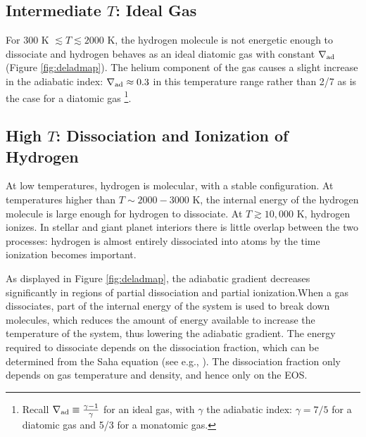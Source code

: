 \documentclass[apj]{emulateapj}
\newcommand{\delad}{\nabla_{\rm ad}}
\newcommand{\App}[1]{Appendix~\ref{#1}}
\begin{document}





\subsection{Intermediate $T$: Ideal Gas}

For $300$ K $\lesssim T \lesssim 2000$ K, the hydrogen molecule is not energetic enough to dissociate and hydrogen behaves as an ideal diatomic gas with constant $\delad$ (Figure \ref{fig:deladmap}). The helium component of the gas causes a slight increase in the adiabatic index: $\delad \approx 0.3$ in this temperature range rather than 2/7 as is the case for a diatomic gas \footnote{Recall $\delad \equiv \frac{\gamma-1}{\gamma}$ for an ideal gas, with $\gamma$ the adiabatic index: $\gamma=7/5$ for a diatomic gas and 5/3 for a monatomic gas.}.



\subsection{High $T$: Dissociation and Ionization of Hydrogen}

At low temperatures, hydrogen is molecular, with a stable configuration. At temperatures higher than $T \sim 2000-3000$ K, the internal energy of the hydrogen molecule is large enough for hydrogen to dissociate. At $T \gtrsim 10,000$ K, hydrogen ionizes. In stellar and giant planet interiors there is little overlap between the two processes: hydrogen is almost entirely dissociated into atoms by the time ionization becomes important. 

As displayed in Figure \ref{fig:deladmap}, the adiabatic gradient decreases significantly in regions of partial dissociation and partial ionization.When a gas dissociates, part of the internal energy of the system is used to break down molecules, which reduces the amount of energy available to increase the temperature of the system, thus lowering the adiabatic gradient. The energy required to dissociate depends on the dissociation fraction, which can be determined from the Saha equation (see e.g., \citealt{kippenhahn90}). The dissociation fraction only depends on gas temperature and density, and hence only on the EOS. 
\end{document}
